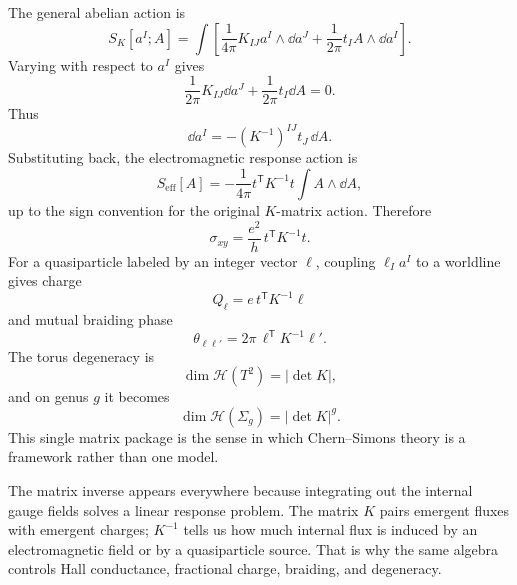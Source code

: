The general abelian action is
\begin{equation}
  S_K[a^I;A]
  =
  \int\left[
  \frac{1}{4\pi}K_{IJ}a^I\wedge\dd a^J
  +
  \frac{1}{2\pi}t_I A\wedge\dd a^I
  \right].
  \label{eq:dense-K-action}
\end{equation}
Varying with respect to $a^I$ gives
\begin{equation}
  \frac{1}{2\pi}K_{IJ}\dd a^J
  +
  \frac{1}{2\pi}t_I\dd A
  =
  0.
  \label{eq:dense-K-eom}
\end{equation}
Thus
\begin{equation}
  \dd a^I
  =
  -(K^{-1})^{IJ}t_J\,\dd A.
  \label{eq:dense-K-solution}
\end{equation}
Substituting back, the electromagnetic response action is
\begin{equation}
  S_{\mathrm{eff}}[A]
  =
  -\frac{1}{4\pi}
  t^{\mathsf T}K^{-1}t
  \int A\wedge\dd A,
  \label{eq:dense-K-effective}
\end{equation}
up to the sign convention for the original $K$-matrix action. Therefore
\begin{equation}
  \sigma_{xy}
  =
  \frac{e^2}{h}\,t^{\mathsf T}K^{-1}t.
  \label{eq:dense-K-hall}
\end{equation}
For a quasiparticle labeled by an integer vector $\ell$, coupling $\ell_I a^I$ to a worldline gives charge
\begin{equation}
  Q_\ell=e\,t^{\mathsf T}K^{-1}\ell
  \label{eq:dense-K-charge}
\end{equation}
and mutual braiding phase
\begin{equation}
  \theta_{\ell\ell'}
  =
  2\pi\,\ell^{\mathsf T}K^{-1}\ell'.
  \label{eq:dense-K-mutual}
\end{equation}
The torus degeneracy is
\begin{equation}
  \dim\mathcal H(T^2)=|\det K|,
  \label{eq:dense-K-torus-degeneracy}
\end{equation}
and on genus $g$ it becomes
\begin{equation}
  \dim\mathcal H(\Sigma_g)=|\det K|^g.
  \label{eq:dense-K-genus}
\end{equation}
This single matrix package is the sense in which Chern--Simons theory is a framework rather than one model.

The matrix inverse appears everywhere because integrating out the internal gauge fields solves a linear response problem. The matrix $K$ pairs emergent fluxes with emergent charges; $K^{-1}$ tells us how much internal flux is induced by an electromagnetic field or by a quasiparticle source. That is why the same algebra controls Hall conductance, fractional charge, braiding, and degeneracy.

